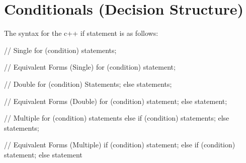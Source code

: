 \documentclass{report}
\begin{document}
    \pagebreak \bigbreak \noindent 
    \section{\LARGE Conditionals (Decision Structure)}
    \bigbreak \noindent 
    The syntax for the c++ if statement is as follows:
    \smallbreak \noindent
    
    \begin{cppcode}

    // Single
    for (condition){
        statements;
    }

    // Equivalent Forms (Single)
    for (condition)
        statement;

    // Double
    for (condition){
        Statements;
    }else {
        statements;
    }

    // Equivalent Forms (Double)
    for (condition)
        statement;
    else 
        statement;

    // Multiple
    for (condition){
        statements
    }else if (condition){
        statements;
    }else {
       statements; 
    }

    // Equivalent Forms (Multiple)
    if (condition)
        statement;
    else if (condition)
        statement;
    else 
        statement

    \end{cppcode}
    

    \bigbreak \noindent 

    \pagebreak \bigbreak \noindent 
\end{document}
